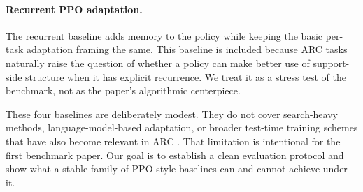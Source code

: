 \paragraph{Recurrent PPO adaptation.} The recurrent baseline adds memory to the policy while keeping the basic per-task adaptation framing the same. This baseline is included because ARC tasks naturally raise the question of whether a policy can make better use of support-side structure when it has explicit recurrence. We treat it as a stress test of the benchmark, not as the paper's algorithmic centerpiece.

These four baselines are deliberately modest. They do not cover search-heavy methods, language-model-based adaptation, or broader test-time training schemes that have also become relevant in ARC \citep{cholletARCPrize20242025,coleDontThrowBaby2025}. That limitation is intentional for the first benchmark paper. Our goal is to establish a clean evaluation protocol and show what a stable family of PPO-style baselines can and cannot achieve under it.
